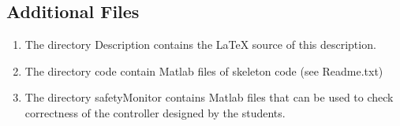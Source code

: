 \documentclass[11pt]{article}
\begin{document}
\subsection*{Additional Files}
\begin{enumerate}
\item
The directory Description contains the LaTeX source of this description.
\item
The directory code contain Matlab files of skeleton code (see Readme.txt)
\item
The directory safetyMonitor contains Matlab files that can be used to check correctness of the controller designed by the students.
\end{enumerate}
\end{document}
